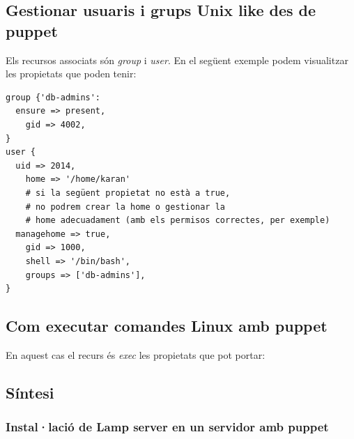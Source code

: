 \documentclass[a4paper]{article}
\begin{document}
\subsection{Gestionar usuaris i grups Unix like des de puppet}
Els recursos associats són \textit{group} i \textit{user}. En el següent exemple podem visualitzar les propietats que poden tenir:
\begin{verbatim}
group {'db-admins':
  ensure => present,
	gid => 4002,
}
user {
  uid => 2014,
	home => '/home/karan'
	# si la següent propietat no està a true, 
	# no podrem crear la home o gestionar la 
	# home adecuadament (amb els permisos correctes, per exemple)
  managehome => true,
	gid => 1000,
	shell => '/bin/bash',
	groups => ['db-admins'],
}
\end{verbatim}

\subsection{Com executar comandes Linux amb puppet}
En aquest cas el recurs \'es \textit{exec} les propietats que pot portar:
\begin{figure}[h]
	\centering
\end{figure}
\subsection{Síntesi}
\subsubsection{Instal·lació de Lamp server en un servidor amb puppet}
\end{document}
